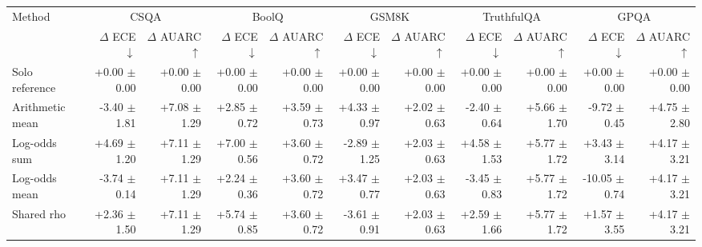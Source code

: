 \begin{tabular}{lrrrrrrrrrr}
\toprule
Method & \multicolumn{2}{c}{CSQA} & \multicolumn{2}{c}{BoolQ} & \multicolumn{2}{c}{GSM8K} & \multicolumn{2}{c}{TruthfulQA} & \multicolumn{2}{c}{GPQA} \\
 & $\Delta$ ECE $\downarrow$ & $\Delta$ AUARC $\uparrow$ & $\Delta$ ECE $\downarrow$ & $\Delta$ AUARC $\uparrow$ & $\Delta$ ECE $\downarrow$ & $\Delta$ AUARC $\uparrow$ & $\Delta$ ECE $\downarrow$ & $\Delta$ AUARC $\uparrow$ & $\Delta$ ECE $\downarrow$ & $\Delta$ AUARC $\uparrow$ \\
\midrule
Solo reference & +0.00 {\scriptsize $\pm$ 0.00} & +0.00 {\scriptsize $\pm$ 0.00} & +0.00 {\scriptsize $\pm$ 0.00} & +0.00 {\scriptsize $\pm$ 0.00} & +0.00 {\scriptsize $\pm$ 0.00} & +0.00 {\scriptsize $\pm$ 0.00} & +0.00 {\scriptsize $\pm$ 0.00} & +0.00 {\scriptsize $\pm$ 0.00} & +0.00 {\scriptsize $\pm$ 0.00} & +0.00 {\scriptsize $\pm$ 0.00} \\
Arithmetic mean & -3.40 {\scriptsize $\pm$ 1.81} & +7.08 {\scriptsize $\pm$ 1.29} & +2.85 {\scriptsize $\pm$ 0.72} & +3.59 {\scriptsize $\pm$ 0.73} & +4.33 {\scriptsize $\pm$ 0.97} & +2.02 {\scriptsize $\pm$ 0.63} & -2.40 {\scriptsize $\pm$ 0.64} & +5.66 {\scriptsize $\pm$ 1.70} & -9.72 {\scriptsize $\pm$ 0.45} & +4.75 {\scriptsize $\pm$ 2.80} \\
Log-odds sum & +4.69 {\scriptsize $\pm$ 1.20} & +7.11 {\scriptsize $\pm$ 1.29} & +7.00 {\scriptsize $\pm$ 0.56} & +3.60 {\scriptsize $\pm$ 0.72} & -2.89 {\scriptsize $\pm$ 1.25} & +2.03 {\scriptsize $\pm$ 0.63} & +4.58 {\scriptsize $\pm$ 1.53} & +5.77 {\scriptsize $\pm$ 1.72} & +3.43 {\scriptsize $\pm$ 3.14} & +4.17 {\scriptsize $\pm$ 3.21} \\
Log-odds mean & -3.74 {\scriptsize $\pm$ 0.14} & +7.11 {\scriptsize $\pm$ 1.29} & +2.24 {\scriptsize $\pm$ 0.36} & +3.60 {\scriptsize $\pm$ 0.72} & +3.47 {\scriptsize $\pm$ 0.77} & +2.03 {\scriptsize $\pm$ 0.63} & -3.45 {\scriptsize $\pm$ 0.83} & +5.77 {\scriptsize $\pm$ 1.72} & -10.05 {\scriptsize $\pm$ 0.74} & +4.17 {\scriptsize $\pm$ 3.21} \\
Shared rho & +2.36 {\scriptsize $\pm$ 1.50} & +7.11 {\scriptsize $\pm$ 1.29} & +5.74 {\scriptsize $\pm$ 0.85} & +3.60 {\scriptsize $\pm$ 0.72} & -3.61 {\scriptsize $\pm$ 0.91} & +2.03 {\scriptsize $\pm$ 0.63} & +2.59 {\scriptsize $\pm$ 1.66} & +5.77 {\scriptsize $\pm$ 1.72} & +1.57 {\scriptsize $\pm$ 3.55} & +4.17 {\scriptsize $\pm$ 3.21} \\

\end{tabular}
